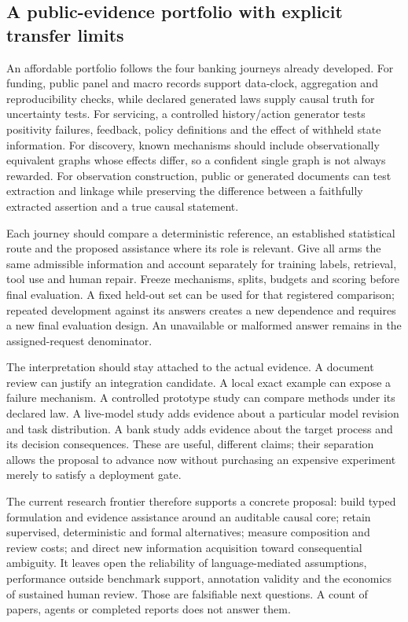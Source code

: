 \subsection{A public-evidence portfolio with explicit transfer limits}

An affordable portfolio follows the four banking journeys already developed.
For funding, public panel and macro records support data-clock, aggregation
and reproducibility checks, while declared generated laws supply causal truth
for uncertainty tests. For servicing, a controlled history/action generator
tests positivity failures, feedback, policy definitions and the effect of
withheld state information. For discovery, known mechanisms should include
observationally equivalent graphs whose effects differ, so a confident single
graph is not always rewarded. For observation construction, public or generated
documents can test extraction and linkage while preserving the difference
between a faithfully extracted assertion and a true causal statement.

Each journey should compare a deterministic reference, an established
statistical route and the proposed assistance where its role is relevant.
Give all arms the same admissible information and account separately for
training labels, retrieval, tool use and human repair. Freeze mechanisms,
splits, budgets and scoring before final evaluation. A fixed held-out set can
be used for that registered comparison; repeated development against its
answers creates a new dependence and requires a new final evaluation design.
An unavailable or malformed answer remains in the assigned-request denominator.

The interpretation should stay attached to the actual evidence. A document
review can justify an integration candidate. A local exact example can expose
a failure mechanism. A controlled prototype study can compare methods under
its declared law. A live-model study adds evidence about a particular model
revision and task distribution. A bank study adds evidence about the target
process and its decision consequences. These are useful, different claims;
their separation allows the proposal to advance now without purchasing an
expensive experiment merely to satisfy a deployment gate.

The current research frontier therefore supports a concrete proposal: build
typed formulation and evidence assistance around an auditable causal core;
retain supervised, deterministic and formal alternatives; measure composition
and review costs; and direct new information acquisition toward consequential
ambiguity. It leaves open the reliability of language-mediated assumptions,
performance outside benchmark support, annotation validity and the economics
of sustained human review. Those are falsifiable next questions. A count of
papers, agents or completed reports does not answer them.
\label{exec13:frontier-synthesis-end}


